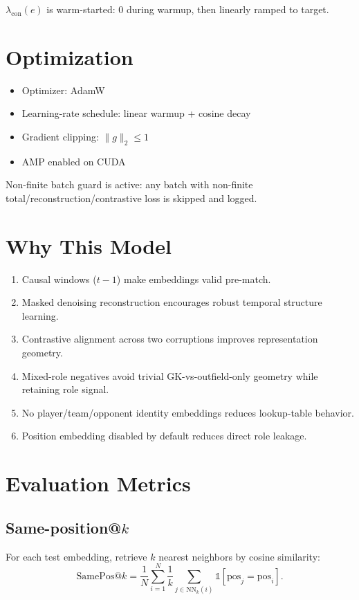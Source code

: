 \documentclass[11pt]{article}
\begin{document}
$\lambda_{\text{con}}(e)$ is warm-started: 0 during warmup, then linearly ramped to target.

\section{Optimization}

\begin{itemize}
  \item Optimizer: AdamW
  \item Learning-rate schedule: linear warmup + cosine decay
  \item Gradient clipping: $\|g\|_2\le 1$
  \item AMP enabled on CUDA
\end{itemize}

Non-finite batch guard is active: any batch with non-finite total/reconstruction/contrastive loss is skipped and logged.

\section{Why This Model}

\begin{enumerate}[label=\arabic*)]
  \item Causal windows ($t-1$) make embeddings valid pre-match.
  \item Masked denoising reconstruction encourages robust temporal structure learning.
  \item Contrastive alignment across two corruptions improves representation geometry.
  \item Mixed-role negatives avoid trivial GK-vs-outfield-only geometry while retaining role signal.
  \item No player/team/opponent identity embeddings reduces lookup-table behavior.
  \item Position embedding disabled by default reduces direct role leakage.
\end{enumerate}

\section{Evaluation Metrics}

\subsection{Same-position@$k$}
For each test embedding, retrieve $k$ nearest neighbors by cosine similarity:
\begin{equation}
\text{SamePos@}k = \frac{1}{N}\sum_{i=1}^{N}\frac{1}{k}\sum_{j\in\text{NN}_k(i)}\mathbb{1}[\text{pos}_j=\text{pos}_i].
\end{equation}
\end{document}
